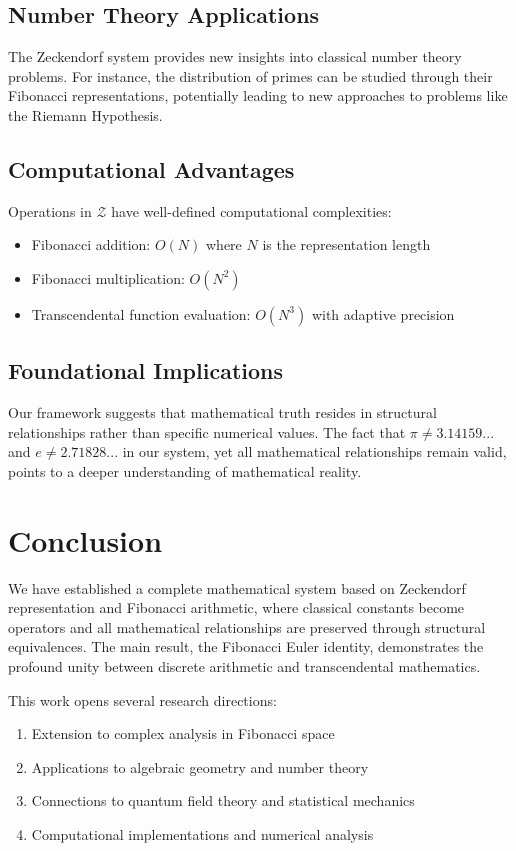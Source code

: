 \documentclass[12pt]{article}
\theoremstyle{plain}
\theoremstyle{definition}
\begin{document}
\subsection{Number Theory Applications}

The Zeckendorf system provides new insights into classical number theory problems. For instance, the distribution of primes can be studied through their Fibonacci representations, potentially leading to new approaches to problems like the Riemann Hypothesis.

\subsection{Computational Advantages}

Operations in $\mathcal{Z}$ have well-defined computational complexities:
\begin{itemize}
\item Fibonacci addition: $O(N)$ where $N$ is the representation length
\item Fibonacci multiplication: $O(N^2)$
\item Transcendental function evaluation: $O(N^3)$ with adaptive precision
\end{itemize}

\subsection{Foundational Implications}

Our framework suggests that mathematical truth resides in structural relationships rather than specific numerical values. The fact that $\pi \neq 3.14159...$ and $e \neq 2.71828...$ in our system, yet all mathematical relationships remain valid, points to a deeper understanding of mathematical reality.

\section{Conclusion}

We have established a complete mathematical system based on Zeckendorf representation and Fibonacci arithmetic, where classical constants become operators and all mathematical relationships are preserved through structural equivalences. The main result, the Fibonacci Euler identity, demonstrates the profound unity between discrete arithmetic and transcendental mathematics.

This work opens several research directions:
\begin{enumerate}
\item Extension to complex analysis in Fibonacci space
\item Applications to algebraic geometry and number theory
\item Connections to quantum field theory and statistical mechanics
\item Computational implementations and numerical analysis
\end{enumerate}
\end{document}
